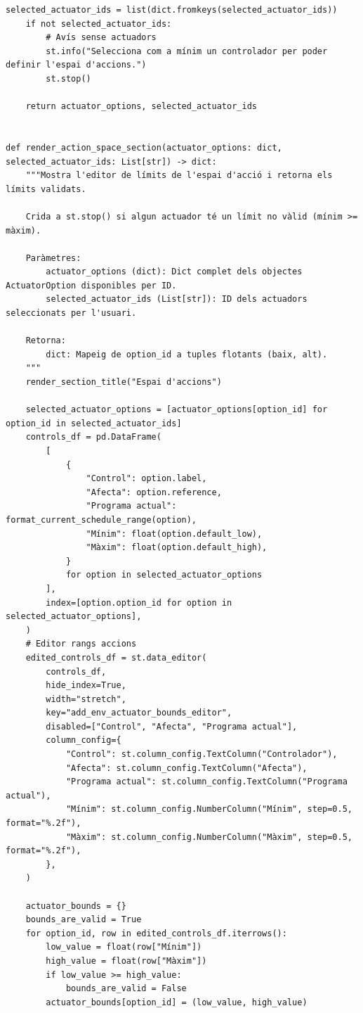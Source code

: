 \documentclass[10pt,a4paper]{article}
\begin{document}
\begin{lstlisting}[style=studioPython,caption={pages/Afegir\_Entorn.py},label={lst:pages-afegir-entorn-py}]
    selected_actuator_ids = list(dict.fromkeys(selected_actuator_ids))
    if not selected_actuator_ids:
        # Avís sense actuadors
        st.info("Selecciona com a mínim un controlador per poder definir l'espai d'accions.")
        st.stop()

    return actuator_options, selected_actuator_ids


def render_action_space_section(actuator_options: dict, selected_actuator_ids: List[str]) -> dict:
    """Mostra l'editor de límits de l'espai d'acció i retorna els límits validats.

    Crida a st.stop() si algun actuador té un límit no vàlid (mínim >= màxim).

    Paràmetres:
        actuator_options (dict): Dict complet dels objectes ActuatorOption disponibles per ID.
        selected_actuator_ids (List[str]): ID dels actuadors seleccionats per l'usuari.

    Retorna:
        dict: Mapeig de option_id a tuples flotants (baix, alt).
    """
    render_section_title("Espai d'accions")

    selected_actuator_options = [actuator_options[option_id] for option_id in selected_actuator_ids]
    controls_df = pd.DataFrame(
        [
            {
                "Control": option.label,
                "Afecta": option.reference,
                "Programa actual": format_current_schedule_range(option),
                "Mínim": float(option.default_low),
                "Màxim": float(option.default_high),
            }
            for option in selected_actuator_options
        ],
        index=[option.option_id for option in selected_actuator_options],
    )
    # Editor rangs accions
    edited_controls_df = st.data_editor(
        controls_df,
        hide_index=True,
        width="stretch",
        key="add_env_actuator_bounds_editor",
        disabled=["Control", "Afecta", "Programa actual"],
        column_config={
            "Control": st.column_config.TextColumn("Controlador"),
            "Afecta": st.column_config.TextColumn("Afecta"),
            "Programa actual": st.column_config.TextColumn("Programa actual"),
            "Mínim": st.column_config.NumberColumn("Mínim", step=0.5, format="%.2f"),
            "Màxim": st.column_config.NumberColumn("Màxim", step=0.5, format="%.2f"),
        },
    )

    actuator_bounds = {}
    bounds_are_valid = True
    for option_id, row in edited_controls_df.iterrows():
        low_value = float(row["Mínim"])
        high_value = float(row["Màxim"])
        if low_value >= high_value:
            bounds_are_valid = False
        actuator_bounds[option_id] = (low_value, high_value)


\end{lstlisting}
\end{document}
